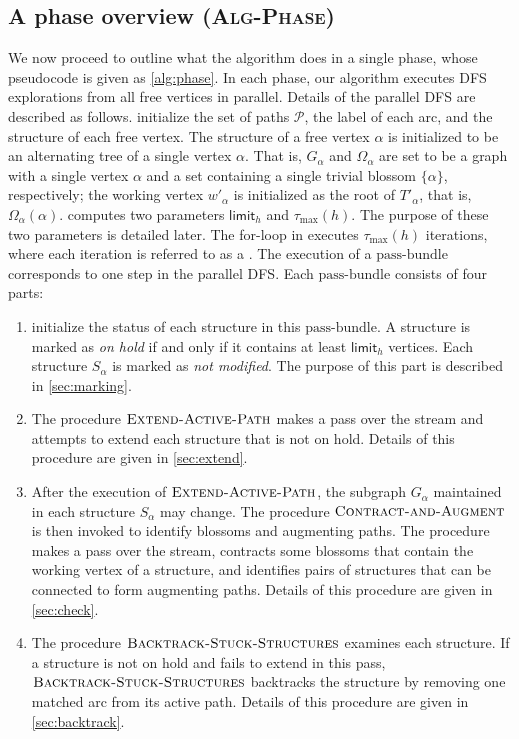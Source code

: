 \documentclass{article}
\newcommand{\alp}{\alpha}
\newcommand{\Omg}{\Omega}
\newcommand{\taumax}{\tau_{\max}}
\newcommand{\calP}{\mathcal{P}}
\newcommand{\bundle}{\text{pass-bundle}\xspace}
\newcommand{\limit}{\mathsf{limit}}
\newcommand{\algPhase}{\textsc{Alg-Phase}\xspace}
\newcommand{\algExtend}{\textsc{Extend-Active-Path}\xspace}
\newcommand{\algBacktrack}{\textsc{Backtrack-Stuck-Structures}\xspace}
\newcommand{\algCheck}{\textsc{Contract-and-Augment}\xspace}
\begin{document}
\subsection{A phase overview (\algPhase)} 
\label{sec:phase}
We now proceed to outline what the algorithm does in a single phase, whose pseudocode is given as \cref{alg:phase}.
In each phase, our algorithm executes DFS explorations from all free vertices in parallel.
Details of the parallel DFS are described as follows.
 initialize the set of paths $\calP$, the label of each arc, and the structure of each free vertex.
The structure of a free vertex $\alp$ is initialized to be an alternating tree of a single vertex $\alp$.
That is, $G_\alp$ and $\Omg_\alp$ are set to be
    a graph with a single vertex $\alp$ and
    a set containing a single trivial blossom $\{\alp\}$, respectively;
the working vertex $w'_\alp$ is initialized as the root of $T'_\alp$, that is, $\Omg_\alp(\alp)$.
 computes two parameters $\limit_h$ and $\taumax(h)$.
The purpose of these two parameters is detailed later.
The for-loop in  executes $\taumax(h)$ iterations, where each iteration is referred to as a \emph{\bundle}.
The execution of a $\bundle$ corresponds to one step in the parallel DFS.
Each $\bundle$ consists of four parts:
\begin{enumerate}[(1)]
    \item {} initialize the status of each structure in this $\bundle$. A structure is marked as \emph{on hold} if and only if it contains at least $\limit_h$ vertices. Each structure $S_\alp$ is marked as \emph{not modified}. The purpose of this part is described in \cref{sec:marking}.
    \item The procedure $\algExtend$ makes a pass over the stream and attempts to extend each structure that is not on hold. Details of this procedure are given in \cref{sec:extend}.
    \item After the execution of $\algExtend$, the subgraph $G_\alp$ maintained in each structure $S_\alp$ may change. 
    The procedure $\algCheck$ is then invoked to identify blossoms and augmenting paths. 
    The procedure makes a pass over the stream, contracts some blossoms that contain the working vertex of a structure, and identifies pairs of structures that can be connected to form augmenting paths. Details of this procedure are given in \cref{sec:check}.
    \item The procedure $\algBacktrack$ examines each structure. If a structure is not on hold and fails to extend in this pass, $\algBacktrack$ backtracks the structure by removing one matched arc from its active path. Details of this procedure are given in \cref{sec:backtrack}.
\end{enumerate}
\end{document}
